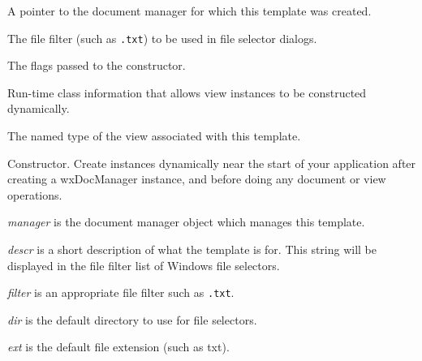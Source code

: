 A pointer to the document manager for which this template was created.

\label{wxdoctemplatemfilefilter}


The file filter (such as {\tt *.txt}) to be used in file selector dialogs.

\label{wxdoctemplatemflags}


The flags passed to the constructor.

\label{wxdoctemplatemviewclassinfo}


Run-time class information that allows view instances to be constructed dynamically.

\label{wxdoctemplatemviewtypename}


The named type of the view associated with this template.

\label{wxdoctemplatector}


Constructor. Create instances dynamically near the start of your application after creating
a wxDocManager instance, and before doing any document or view operations.

{\it manager} is the document manager object which manages this template.

{\it descr} is a short description of what the template is for. This string will be displayed in the
file filter list of Windows file selectors.

{\it filter} is an appropriate file filter such as {\tt *.txt}.

{\it dir} is the default directory to use for file selectors.

{\it ext} is the default file extension (such as txt).

